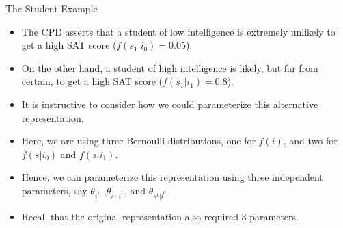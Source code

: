 \documentclass[handout]{beamer}
\begin{document}
\begin{frame}{The Student Example}
\scriptsize{
\begin{itemize}

\item The CPD asserts that a student of low intelligence is extremely unlikely to get a high SAT score ($f(s_1 | i_0 ) = 0.05$).
\item On the other hand, a student of high intelligence is likely, but far from
certain, to get a high SAT score ($f(s_1 | i_1 ) = 0.8$).

\item It is instructive to consider how we could parameterize this alternative representation. 
\item Here, we are using three Bernoulli distributions, one for $f(i)$, and two for $f(s | i_0)$ and $f(s|i_1)$.
\item Hence, we can parameterize this representation using three independent parameters, say $\theta_{i^1}$ ,$\theta_{s^1|i^1}$, and $\theta_{s^1|i^0}$

\item Recall that the original representation also required 3 parameters.



\end{itemize}



} 

\end{frame}
\end{document}
